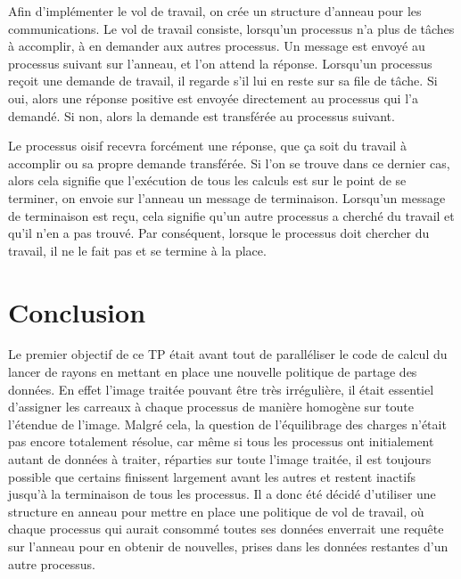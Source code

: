 \documentclass[a4paper,11pt]{article}
\begin{document}
Afin d'implémenter le vol de travail, on crée un structure d'anneau pour les communications.
Le vol de travail consiste, lorsqu'un processus n'a plus de tâches à accomplir, à en demander aux autres processus. Un message est envoyé au processus suivant sur l'anneau, et l'on attend la réponse. Lorsqu'un processus reçoit une demande de travail, il regarde s'il lui en reste sur sa file de tâche. Si oui, alors une réponse positive est envoyée directement au processus qui l'a demandé. Si non, alors la demande est transférée au processus suivant.

Le processus oisif recevra forcément une réponse, que ça soit du travail à accomplir ou sa propre demande transférée. Si l'on se trouve dans ce dernier cas, alors cela signifie que l'exécution de tous les calculs est sur le point de se terminer, on envoie sur l'anneau un message de terminaison. Lorsqu'un message de terminaison est reçu, cela signifie qu'un autre processus a cherché du travail et qu'il n'en a pas trouvé. Par conséquent, lorsque le processus doit chercher du travail, il ne le fait pas et se termine à la place.


\section{Conclusion}
Le premier objectif de ce TP était avant tout de paralléliser le code de calcul du lancer de rayons en mettant en place une nouvelle politique de partage des données. En effet l'image traitée pouvant être très irrégulière, il était essentiel d'assigner les carreaux à chaque processus de manière homogène sur toute l'étendue de l'image. Malgré cela, la question de l'équilibrage des charges n'était pas encore totalement résolue, car même si tous les processus ont initialement autant de données à traiter, réparties sur toute l'image traitée, il est toujours possible que certains finissent largement avant les autres et restent inactifs jusqu'à la terminaison de tous les processus.  Il a donc été décidé d'utiliser une structure en anneau pour mettre en place une politique de vol de travail, où chaque processus qui aurait consommé toutes ses données enverrait une requête sur l'anneau pour en obtenir de nouvelles, prises dans les données restantes d'un autre processus. %
\end{document}
